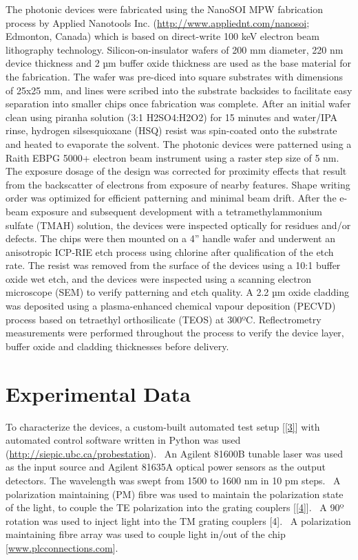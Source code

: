 The photonic devices were fabricated using the NanoSOI MPW fabrication
process by Applied Nanotools Inc.
(\url{http://www.appliednt.com/nanosoi}; Edmonton, Canada) which is
based on direct-write 100 keV electron beam lithography technology.
Silicon-on-insulator wafers of 200 mm diameter, 220 nm device thickness
and 2 µm buffer oxide thickness are used as the base material for the
fabrication. The wafer was pre-diced into square substrates with
dimensions of 25x25 mm, and lines were scribed into the substrate
backsides to facilitate easy separation into smaller chips once
fabrication was complete. After an initial wafer clean using piranha
solution (3:1 H2SO4:H2O2) for 15 minutes and water/IPA rinse, hydrogen
silsesquioxane (HSQ) resist was spin-coated onto the substrate and
heated to evaporate the solvent. The photonic devices were patterned
using a Raith EBPG 5000+ electron beam instrument using a raster step
size of 5 nm. The exposure dosage of the design was corrected for
proximity effects that result from the backscatter of electrons from
exposure of nearby features. Shape writing order was optimized for
efficient patterning and minimal beam drift. After the e-beam exposure
and subsequent development with a tetramethylammonium sulfate (TMAH)
solution, the devices were inspected optically for residues and/or
defects. The chips were then mounted on a 4'' handle wafer and underwent
an anisotropic ICP-RIE etch process using chlorine after qualification
of the etch rate. The resist was removed from the surface of the devices
using a 10:1 buffer oxide wet etch, and the devices were inspected using
a scanning electron microscope (SEM) to verify patterning and etch
quality. A 2.2 µm oxide cladding was deposited using a plasma-enhanced
chemical vapour deposition (PECVD) process based on tetraethyl
orthosilicate (TEOS) at 300ºC. Reflectrometry measurements were
performed throughout the process to verify the device layer, buffer
oxide and cladding thicknesses before delivery.\\

\section{Experimental Data}\label{auto-label-section-658796}

To characterize the devices, a custom-built automated test setup
{[}\hyperref[csl:3]{[3]}{]} with automated control software written in
Python was used (\url{http://siepic.ubc.ca/probestation}). ~An Agilent
81600B tunable laser was used as the input source and Agilent 81635A
optical power sensors as the output detectors. The wavelength was swept
from 1500 to 1600 nm in 10 pm steps. ~A polarization maintaining (PM)
fibre was used to maintain the polarization state of the light, to
couple the TE polarization into the grating couplers
{[}\hyperref[csl:4]{[4]}{]}. ~A 90º rotation was used to inject light into
the TM grating couplers {[}4{]}. ~A polarization maintaining fibre array
was used to couple light in/out of the chip
{[}\href{http://www.plcconnections.com}{www.plcconnections.com}{]}.\\

